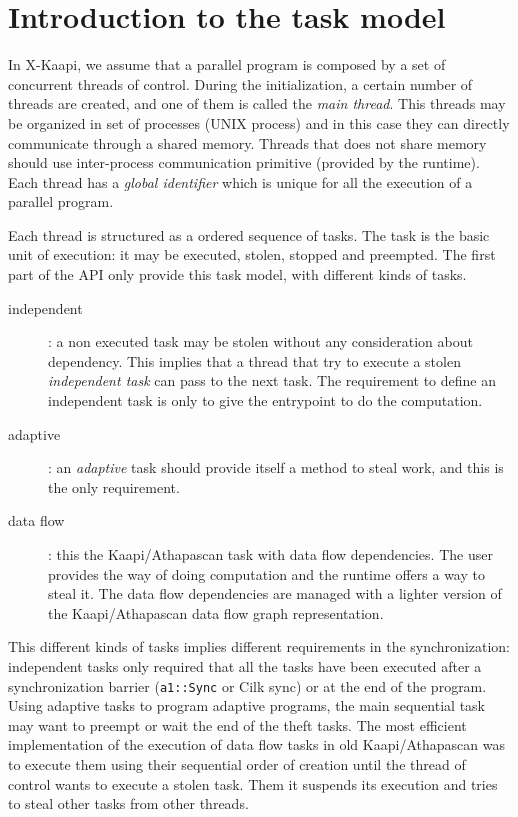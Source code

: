 \documentclass[12pt]{report}
\newcommand{\kaapi}{\textsc{X}-Kaapi\xspace}
\begin{document}
\section{Introduction to the task model}

In \kaapi, we assume that a parallel program is composed by a set of concurrent threads of control. During the initialization, a certain number of threads are created, and one of them is called the \textit{main thread}. This threads may be organized in set of processes (UNIX process) and in this case they can directly communicate through a shared memory.
Threads that does not share memory should use inter-process communication primitive (provided by the runtime).
Each thread has a \textit{global identifier} which is unique for all the execution of a parallel program. 

Each thread is structured as a ordered sequence of tasks. The task is the basic unit of execution: it may be executed, stolen, stopped and preempted. 
The first part of the API only provide this task model, with different kinds of tasks.
\begin{description}
\item [independent]: a non executed task may be stolen without any consideration about dependency. This implies that a thread that try to execute a stolen \textit{independent task} can pass to the next task. The requirement to define an independent task is only to give the entrypoint to do the computation.
\item [adaptive]: an \textit{adaptive} task should provide itself a method to steal work, and this is the only requirement.
\item [data flow]: this the Kaapi/Athapascan task with data flow dependencies. The user provides the way of doing computation and the runtime offers a way to steal it. The data flow dependencies are managed with a lighter version of the Kaapi/Athapascan data flow graph representation.
\end{description}

This different kinds of tasks implies different requirements in the synchronization: independent tasks only required that all the tasks have been executed after a synchronization barrier (\verb+a1::Sync+ or Cilk sync) or at the end of the program.
Using adaptive tasks to program adaptive programs, the main sequential task may want to preempt or wait the end of the 
theft tasks.
The most efficient implementation of the execution of data flow tasks in old Kaapi/Athapascan was to execute them using their
sequential order of creation until the thread of control wants to execute a stolen task. Them it suspends its execution and tries to steal other tasks from other threads.
\end{document}
